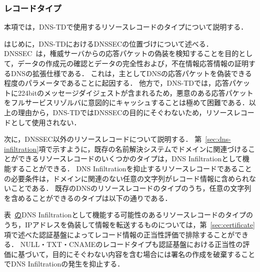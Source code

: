\subsubsection{レコードタイプ}
本項では，DNS-TDで使用するリソースレコードのタイプについて説明する．

はじめに，DNS-TDにおけるDNSSECの位置づけについて述べる．
DNSSEC~\cite{rfc4033}は，権威サーバからの応答パケットの偽装を検知することを目的として，データの作成元の確認とデータの完全性および，不在情報応答情報の証明するDNSの拡張仕様である．
これは，主としてDNSの応答パケットを偽装できる程度のパラメータであることに起因する．
他方で，DNS-TDでは，応答パケットに224bitのメッセージダイジェストが含まれるため，悪意のある応答パケットをフルサービスリゾルバに意図的にキャッシュすることは極めて困難である．以上の理由から，DNS-TDではDNSSECの目的にそぐわないため，リソースレコードとして使用されない．

次に，DNSSEC以外のリソースレコードについて説明する．
第~\ref{sec:dns-infiltration}項で示すように，既存の名前解決システムでドメインに関連づけることができるリソースレコードのいくつかのタイプは，DNS Infiltrationとして機能することができる．
DNS Infiltrationを抑止するリソースレコードであることの必要条件は，ドメインに関連のない任意の文字列がレコード情報に含められないことである．
既存のDNSのリソースレコードのタイプのうち，任意の文字列を含めることができるのタイプは以下の通りである．

表~\href{tab:infil-rtype}のDNS Infiltrationとして機能する可能性のあるリソースレコードのタイプのうち，IPアドレスを偽装して情報を転送するものについては，第~\ref{sec:certificate}項で述べた認証基盤によってレコード情報の正当性評価で排除することができる．
NULL・TXT・CNAMEのレコードタイプも認証基盤における正当性の評価に基づいて，目的にそぐわない内容を含む場合には署名の作成を破棄することでDNS Infiltrationの発生を抑止する．



